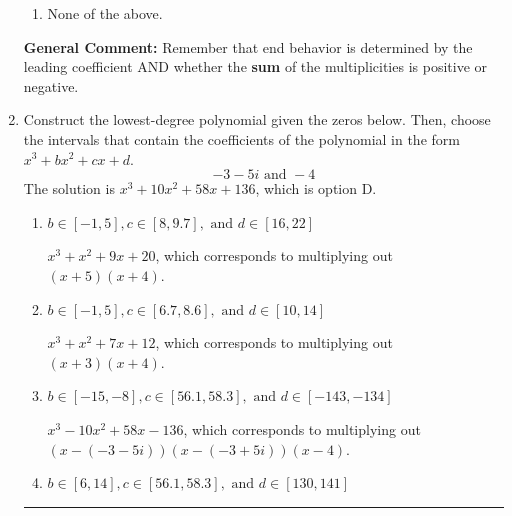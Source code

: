 \documentclass{extbook}[14pt]
\newcommand{\litem}[1]{\item #1

\rule{\textwidth}{0.4pt}}
\begin{document}
\begin{enumerate}
{\begin{enumerate}[label=\Alph*.]
\item None of the above.\end{enumerate}
\textbf{General Comment:} Remember that end behavior is determined by the leading coefficient AND whether the \textbf{sum} of the multiplicities is positive or negative.
}
\litem{
Construct the lowest-degree polynomial given the zeros below. Then, choose the intervals that contain the coefficients of the polynomial in the form $x^3+bx^2+cx+d$.
\[ -3 - 5 i \text{ and } -4 \]The solution is \( x^{3} +10 x^{2} +58 x + 136 \), which is option D.\begin{enumerate}[label=\Alph*.]
\item \( b \in [-1, 5], c \in [8, 9.7], \text{ and } d \in [16, 22] \)

$x^{3} + x^{2} +9 x + 20$, which corresponds to multiplying out $(x + 5)(x + 4)$.
\item \( b \in [-1, 5], c \in [6.7, 8.6], \text{ and } d \in [10, 14] \)

$x^{3} + x^{2} +7 x + 12$, which corresponds to multiplying out $(x + 3)(x + 4)$.
\item \( b \in [-15, -8], c \in [56.1, 58.3], \text{ and } d \in [-143, -134] \)

$x^{3} -10 x^{2} +58 x -136$, which corresponds to multiplying out $(x-(-3 - 5 i))(x-(-3 + 5 i))(x -4)$.
\item \( b \in [6, 14], c \in [56.1, 58.3], \text{ and } d \in [130, 141] \)


\end{enumerate}}
\end{enumerate}
\end{document}
